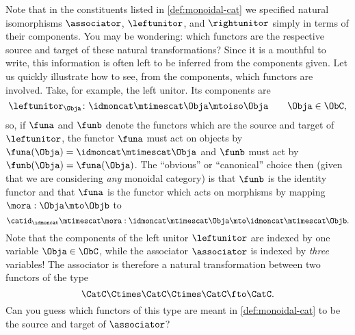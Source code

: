 \begin{remark}
    Note that in the constituents listed in \cref{def:monoidal-cat} we specified natural isomorphisms $\associator$, $\leftunitor$, and $\rightunitor$ simply in terms of their components.
    You may be wondering: which functors are the respective source and target of these natural transformations?
    Since it is a mouthful to write, this information is often left to be inferred from the components given.
    Let us quickly illustrate how to see, from the components, which functors are involved.
    Take, for example, the left unitor.
    Its components are
    \begin{equation*}
        \leftunitor_\Obja \colon \idmoncat\mtimescat \Obja \mtoiso \Obja \quad \quad \Obja\in \ObC,
    \end{equation*}
    so, if $\funa$ and $\funb$ denote the functors which are the source and target of $\leftunitor$, the functor $\funa$ must act on objects by $\funa(\Obja) = \idmoncat \mtimescat \Obja$ and $\funb$ must act by $\funb(\Obja) = \funa(\Obja)$.
    The ``obvious'' or ``canonical'' choice then (given that we are considering \emph{any} monoidal category) is that $\funb$ is the identity functor and that $\funa$ is the functor which acts on morphisms by mapping $\mora : \Obja \mto \Objb$ to
    \begin{equation}
        \catid_\idmoncat \mtimescat \mora:   \idmoncat\mtimescat \Obja \mto  \idmoncat\mtimescat \Objb.
    \end{equation}
    Note that the components of the left unitor $\leftunitor$ are indexed by one variable $\Obja \in \ObC$, while the associator $\associator$ is indexed by \emph{three} variables!
    The associator is therefore a natural transformation between two functors of the type
    \begin{equation}
        \CatC \Ctimes \CatC \Ctimes \CatC \fto \CatC.
    \end{equation}
    Can you guess which functors of this type are meant in \cref{def:monoidal-cat} to be the source and target of $\associator$?
\end{remark}


